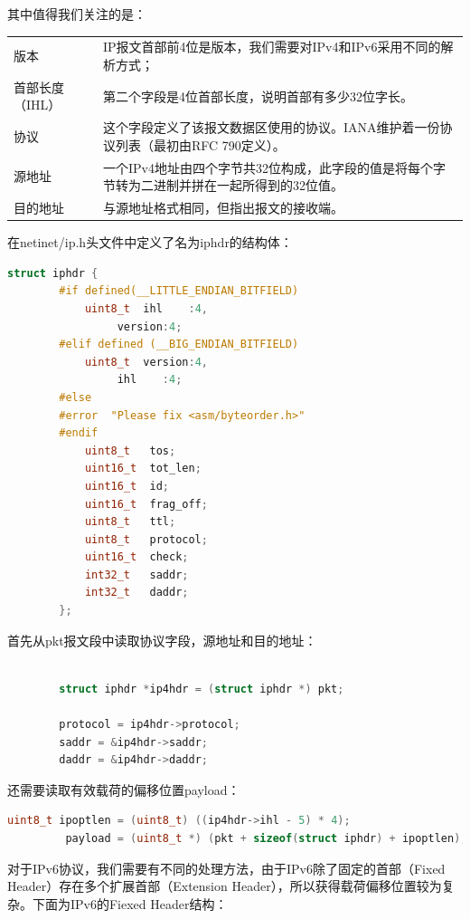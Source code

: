 \documentclass[format=final, language=chinese, degree=fyp]{hustthesis}
\begin{document}
其中值得我们关注的是：
\begin{table}[h!]
\begin{tabular}{l l}
	版本 & IP报文首部前4位是版本，我们需要对IPv4和IPv6采用不同的解析方式；\\
	首部长度（IHL） & 第二个字段是4位首部长度，说明首部有多少32位字长。\\
	协议 & 这个字段定义了该报文数据区使用的协议。IANA维护着一份协议列表（最初由RFC 790定义）。\\
	源地址 & 一个IPv4地址由四个字节共32位构成，此字段的值是将每个字节转为二进制并拼在一起所得到的32位值。\\
	目的地址 & 与源地址格式相同，但指出报文的接收端。
\end{tabular}
\end{table}


在netinet/ip.h头文件中定义了名为iphdr的结构体：
\begin{lstlisting}[language=c]
        struct iphdr {
        #if defined(__LITTLE_ENDIAN_BITFIELD)
            uint8_t  ihl    :4,
                 version:4;
        #elif defined (__BIG_ENDIAN_BITFIELD)
            uint8_t  version:4,
                 ihl    :4;
        #else
        #error	"Please fix <asm/byteorder.h>"
        #endif
            uint8_t	  tos;
            uint16_t  tot_len;
            uint16_t  id;
            uint16_t  frag_off;
            uint8_t   ttl;
            uint8_t   protocol;
            uint16_t  check;
            int32_t   saddr;
            int32_t   daddr;
        };
\end{lstlisting}

首先从pkt报文段中读取协议字段，源地址和目的地址：

\begin{lstlisting}[language=c]

        struct iphdr *ip4hdr = (struct iphdr *) pkt;

        protocol = ip4hdr->protocol;
        saddr = &ip4hdr->saddr;
        daddr = &ip4hdr->daddr;

\end{lstlisting}

还需要读取有效载荷的偏移位置payload：

\begin{lstlisting}[language=c]
         uint8_t ipoptlen = (uint8_t) ((ip4hdr->ihl - 5) * 4);
         payload = (uint8_t *) (pkt + sizeof(struct iphdr) + ipoptlen);
\end{lstlisting}

对于IPv6协议，我们需要有不同的处理方法，由于IPv6除了固定的首部（Fixed Header）存在多个扩展首部（Extension Header），所以获得载荷偏移位置较为复杂。下面为IPv6的Fiexed Header结构：
\end{document}
